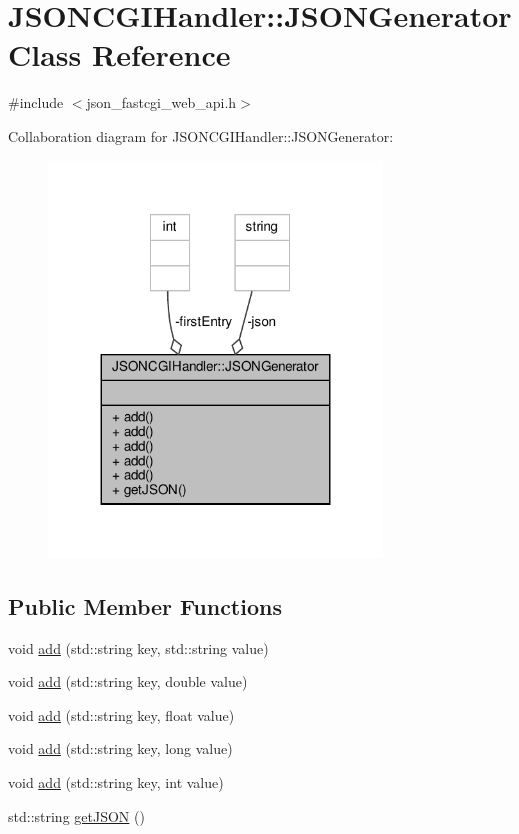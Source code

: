 \hypertarget{classJSONCGIHandler_1_1JSONGenerator}{}\section{J\+S\+O\+N\+C\+G\+I\+Handler\+:\+:J\+S\+O\+N\+Generator Class Reference}
\label{classJSONCGIHandler_1_1JSONGenerator}


{\ttfamily \#include $<$json\+\_\+fastcgi\+\_\+web\+\_\+api.\+h$>$}



Collaboration diagram for J\+S\+O\+N\+C\+G\+I\+Handler\+:\+:J\+S\+O\+N\+Generator\+:\nopagebreak
\begin{figure}[H]
\begin{center}
\leavevmode
\includegraphics[width=251pt]{classJSONCGIHandler_1_1JSONGenerator__coll__graph}
\end{center}
\end{figure}
\subsection*{Public Member Functions}
\begin{DoxyCompactItemize}
\item 
void \hyperlink{classJSONCGIHandler_1_1JSONGenerator_a191efd00967cbace0d9ddfedea39cd9b}{add} (std\+::string key, std\+::string value)
\item 
void \hyperlink{classJSONCGIHandler_1_1JSONGenerator_aa25099deb2442335298ab1c021f36910}{add} (std\+::string key, double value)
\item 
void \hyperlink{classJSONCGIHandler_1_1JSONGenerator_a2192849b22341653a138bb63da6c6c9a}{add} (std\+::string key, float value)
\item 
void \hyperlink{classJSONCGIHandler_1_1JSONGenerator_afc3e9374b0e49ca1f701bd22bbd4cd92}{add} (std\+::string key, long value)
\item 
void \hyperlink{classJSONCGIHandler_1_1JSONGenerator_a87fe5c75b46f9822255535a61f15ad4b}{add} (std\+::string key, int value)
\item 
std\+::string \hyperlink{classJSONCGIHandler_1_1JSONGenerator_afec28cd80e562955e2cd8cdb92d86205}{get\+J\+S\+ON} ()
\end{DoxyCompactItemize}
